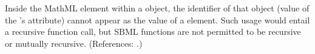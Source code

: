 Inside the  MathML element within a \FunctionDefinition
object, the identifier of that object (\ie value of the
\FunctionDefinition's  attribute) cannot appear as the value of a
 element.  Such usage would entail a recursive function call, but
SBML functions are not permitted to be recursive or mutually recursive.  (References: .)
